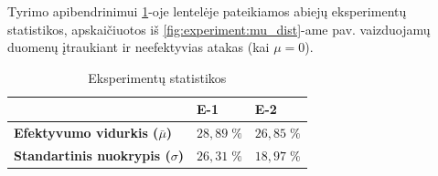 Tyrimo apibendrinimui \ref{tab:experiment:stats}-oje lentelėje pateikiamos
abiejų eksperimentų statistikos, apskaičiuotos iš
\ref{fig:experiment:mu_dist}-ame pav. vaizduojamų duomenų įtraukiant ir
neefektyvias atakas (kai $\mu = 0$).

\begin{table}[h]
    \centering
    \caption{Eksperimentų statistikos}\label{tab:experiment:stats}
    \begin{tabular}{l|l|l}
                                                   & \textbf{E-1}  & \textbf{E-2}  \\
        \midrule
        \textbf{Efektyvumo vidurkis ($\bar{\mu}$)} & $28,89 \; \%$ & $26,85 \; \%$ \\
        \textbf{Standartinis nuokrypis ($\sigma$)} & $26,31 \; \%$ & $18,97 \; \%$ \\
    \end{tabular}
\end{table}

